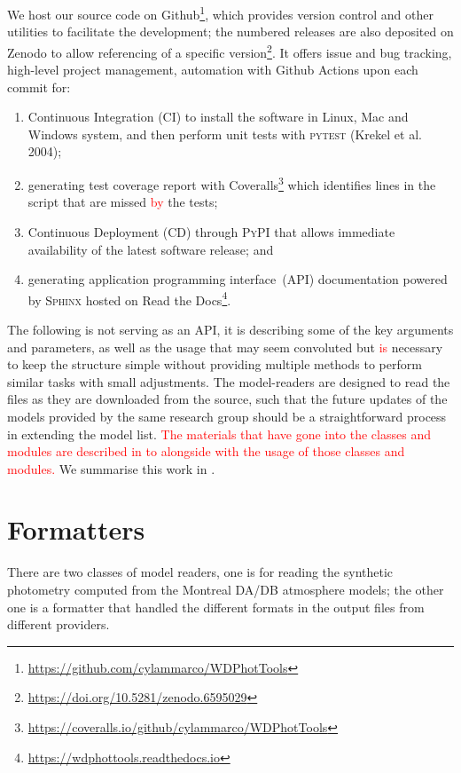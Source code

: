 \documentclass[fleqn,usenatbib]{rasti}
\begin{document}
We host our source code on Github\footnote{\url{https://github.com/cylammarco/WDPhotTools}},
which provides version control and other utilities to facilitate the
development; the numbered releases are also deposited on Zenodo to allow
referencing of a specific version\footnote{\url{https://doi.org/10.5281/zenodo.6595029}}.
It offers issue and bug tracking, high-level project management,
automation with Github Actions upon each commit for:

\begin{enumerate}
    \item Continuous Integration (CI) to install the software in Linux, Mac
    and Windows system, and then perform unit tests with \textsc{pytest}
    (Krekel et al. 2004);
    \item generating test coverage report with Coveralls\footnote{\url{
    https://coveralls.io/github/cylammarco/WDPhotTools}}
    which identifies
    lines in the script that are missed \textcolor{red}{by} the tests;
    \item Continuous Deployment (CD) through \textsc{PyPI} that allows
    immediate availability of the latest software release; and
    \item generating application programming interface~(API) documentation
    powered by \textsc{Sphinx} hosted on
    Read the Docs\footnote{\url{https://wdphottools.readthedocs.io}}.
\end{enumerate}

The following is not serving as an API, it is describing some of the key
arguments and parameters, as well as the usage that may seem convoluted but
\textcolor{red}{is} necessary to keep the structure simple without providing
multiple methods to perform similar tasks with small adjustments. The
model-readers are designed to read the files as they are downloaded from the
source, such that the future updates of the models provided by the same research
group should be a straightforward process in extending the model list.
\textcolor{red}{The materials that have gone into the classes and modules are
described in  to  alongside with the usage of those
classes and modules.} We summarise this work in .

\section{Formatters}
There are two classes of model readers, one is for reading the synthetic
photometry computed from the Montreal DA/DB atmosphere models; the other one is
a formatter that handled the different formats in the output files from
different providers.
\end{document}
